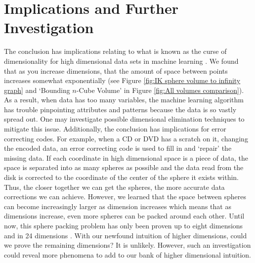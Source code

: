 \section{Implications and Further Investigation} 
The conclusion has implications relating to what is known as the curse of dimensionality for high dimensional data sets in machine learning \cite{raviv2020perm2vec}. We found that as you increase dimensions, that the amount of space between points increases somewhat exponentially (see Figure \ref{fig:IK sphere volume to infinity graph} and `Bounding $n$-Cube Volume' in Figure \ref{fig:All volumes comparison}). As a result, when data has too many variables, the machine learning algorithm has trouble pinpointing attributes and patterns because the data is so vastly spread out. One may investigate possible dimensional elimination techniques to mitigate this issue. Additionally, the conclusion has implications for error correcting codes. For example, when a CD or DVD has a scratch on it, changing the encoded data, an error correcting code is used to fill in and `repair' the missing data. If each coordinate in high dimensional space is a piece of data, the space is separated into as many spheres as possible and the data read from the disk is corrected to the coordinate of the center of the sphere it exists within. Thus, the closer together we can get the spheres, the more accurate data corrections we can achieve. However, we learned that the space between spheres can become increasingly larger as dimension increases which means that as dimensions increase, even more spheres can be packed around each other. Until now, this sphere packing problem has only been proven up to eight dimensions and in 24 dimensions \cite{klarreich2016sphere}. With our newfound intuition of higher dimensions, could we prove the remaining dimensions? It is unlikely. However, such an investigation could reveal more phenomena to add to our bank of higher dimensional intuition.